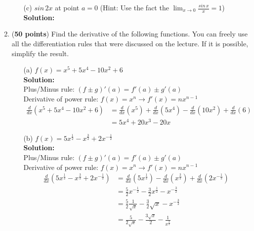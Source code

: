 \documentclass[a4paper]{article}
\begin{document}
\begin{enumerate}
\begin{enumerate}
	
	
	\item[(c)] $sin \, 2x$ at point $a = 0$ (Hint: Use the fact the $\lim_{x \to 0} \frac{sin \, x}{x} = 1$)\\
	\textbf{Solution:}\\	
	
	
\end{enumerate}

	
	\item (\textbf{50 points}) Find the derivative of the following functions. You can freely use all the differentiation rules that were discussed on the lecture. If it is possible, simplify the result.\\
	
	\begin{enumerate}
		\item[(a)] $f(x) = x^5 + 5x^4 - 10x^2 + 6$\\
		\textbf{Solution:}\\
		
Plus/Minus rule: $(f \pm g)'(a) = f'(a) \pm g'(a)$\\
Derivative of power rule: $f(x) = x^n \rightarrow f'(x) = nx^{n-1}$\\

\begin{align*}
\frac{d}{dx}(x^5 + 5x^4 - 10x^2 + 6) &= \frac{d}{dx}(x^5) + \frac{d}{dx}(5x^4) - \frac{d}{dx}(10x^2) + \frac{d}{dx}(6)\\
&= 5x^4 + 20x^3 - 20x
\end{align*}



		\item[(b)] $f(x) = 5x^\frac{1}{2} - x^\frac{3}{2} + 2x^{-\frac{1}{2}}$\\
		\textbf{Solution:}\\	
		
Plus/Minus rule: $(f \pm g)'(a) = f'(a) \pm g'(a)$\\
Derivative of power rule: $f(x) = x^n \rightarrow f'(x) = nx^{n-1}$\\

\begin{align*}
\frac{d}{dx}(5x^\frac{1}{2} - x^\frac{3}{2} + 2x^{-\frac{1}{2}}) &= \frac{d}{dx}(5x^\frac{1}{2}) - \frac{d}{dx}(x^\frac{3}{2}) + \frac{d}{dx}(2x^{-\frac{1}{2}})\\
&= \frac{5}{2}x^{-\frac{1}{2}} - \frac{3}{2}x^\frac{1}{2} - x^{-\frac{3}{2}}\\
&= \frac{5}{2}\frac{1}{\sqrt{x}} - \frac{3}{2} \sqrt{x} - x^{-\frac{3}{2}}\\
&= \frac{5}{2\sqrt{x}} - \frac{3\sqrt{x}}{2} - \frac{1}{x^\frac{3}{2}}
\end{align*}
		

\end{enumerate}
\end{enumerate}
\end{document}
